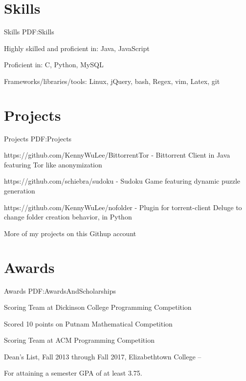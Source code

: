 \documentclass[letterpaper,MMMyyyy,nonstop]{simpleresumecv}
\begin{document}
\begin{body}
\bigskip


\section
{Skills}
{Skills}
{PDF:Skills}

\BulletItem
Highly skilled and proficient in: Java, JavaScript

\Gap
\BulletItem
Proficient in: C, Python, MySQL

\Gap
\BulletItem
Frameworks/libraries/tools: Linux, jQuery, bash, Regex, vim, Latex, git


\bigskip


\section
{Projects}
{Projects}
{PDF:Projects}

\BulletItem
https://github.com/KennyWuLee/BittorrentTor - Bittorrent Client in Java featuring Tor like anonymization

\Gap
\BulletItem
https://github.com/schiebra/sudoku - Sudoku Game featuring dynamic puzzle generation

\Gap
\BulletItem
https://github.com/KennyWuLee/nofolder - Plugin for torrent-client Deluge to change folder creation behavior, in Python

\Gap
\BulletItem
More of my projects on this Githup account


\bigskip


\section
{Awards}
{Awards}
{PDF:AwardsAndScholarships}

\Gap
\BulletItem
Scoring Team at Dickinson College Programming Competition
\hfill
{}

\Gap
\BulletItem
Scored 10 points on Putnam Mathematical Competition
\hfill
{}

\Gap
\BulletItem
Scoring Team at ACM Programming Competition
\hfill
{}

\BulletItem
Dean's List,
Fall 2013 through Fall 2017,
Elizabethtown College
\hfill
{} --
\begin{detail}
\SubItem
For attaining a semester GPA of at least 3.75.
\end{detail}

\end{body}
\end{document}
